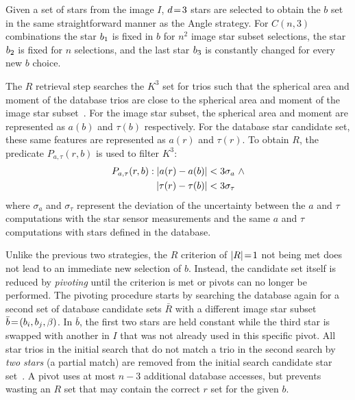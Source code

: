 Given a set of stars from the image $I$, $d \!=\! 3$ stars are selected to obtain the $b$ set in the same
straightforward manner as the Angle strategy.
For $C(n, 3)$ combinations the star $b_1$ is fixed in $b$ for $n^2$ image star subset selections,
the star $b_2$ is fixed for $n$ selections, and the last star $b_3$ is constantly changed for
every new $b$ choice.

The $R$ retrieval step searches the $K^3$ set for trios such that the spherical area and moment of the database
trios are close to the spherical area and moment of the image star
subset~\cite{coleAndCrassidis:sphericalTriangleMethod}.
For the image star subset, the spherical area and moment are represented as $a(b)$ and $\tau(b)$ respectively.
For the database star candidate set, these same features are represented as $a(r)$ and $\tau(r)$.
To obtain $R$, the predicate $P_{a, \tau}(r, b)$ is used to filter $K^3$:
\begin{equation}
    \begin{aligned}
        P_{a, \tau}(r, b) : \left|  a(r) - a(b) \right| &< 3\sigma_{a}
        \ \land \\ \left| \tau(r) - \tau(b) \right| &< 3\sigma_{\tau}
    \end{aligned}
\end{equation}
where $\sigma_{a}$ and $\sigma_{\tau}$ represent the deviation of the uncertainty between the $a$ and $\tau$
computations with the star sensor measurements and the same $a$ and $\tau$ computations with stars defined in the
database.

Unlike the previous two strategies, the $R$ criterion of $|R| \!=\! 1$ not being met does not lead to an immediate new
selection of $b$.
Instead, the candidate set itself is reduced by \textit{pivoting} until the criterion is met or pivots can no longer
be performed.
The pivoting procedure starts by searching the database again for a second set of database candidate sets $\bar{R}$ with
a different image star subset $\bar{b} \!=\! \left(b_i, b_j, \beta\right)$.
In $\bar{b}$, the first two stars are held constant while the third star is swapped with another in $I$ that was not
already used in this specific pivot.
All star trios in the initial search that do not match a trio in the second search by \textit{two stars} (a partial
match) are removed from the initial search candidate star set~\cite{coleAndCrassidis:sphericalTriangleMethod}.
A pivot uses at most $n - 3$ additional database accesses, but prevents wasting an $R$ set that may contain
the correct $r$ set for the given $b$.

